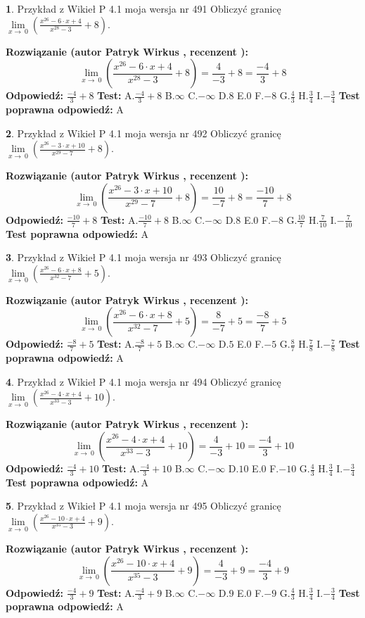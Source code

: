 \documentclass[12pt, a4paper]{article}
\theoremstyle{definition} %
\newtheorem{zad}{}
\newcommand{\zadStart}[1]{\begin{zad}#1\newline}
\newcommand{\zadStop}{\end{zad}}
\newcommand{\rozwStart}[2]{\noindent \textbf{Rozwiązanie (autor #1 , recenzent #2): }\newline}
\newcommand{\rozwStop}{\newline}
\newcommand{\odpStart}{\noindent \textbf{Odpowiedź:}\newline}
\newcommand{\odpStop}{\newline}
\newcommand{\testStart}{\noindent \textbf{Test:}\newline}
\newcommand{\testStop}{\newline}
\newcommand{\kluczStart}{\noindent \textbf{Test poprawna odpowiedź:}\newline}
\newcommand{\kluczStop}{\newline}
\begin{document}
\zadStart{Przykład z Wikieł P 4.1 moja wersja nr 491}
Obliczyć granicę $\lim\limits_{x\to\ 0}(\frac{x^{26}-6 \cdot x +4}{x^{28}-3}+8)$.
\zadStop
\rozwStart{Patryk Wirkus}{}
$$\lim\limits_{x\to\ 0}(\frac{x^{26}-6 \cdot x +4}{x^{28}-3}+8)=\frac{4}{-3}+8=\frac{-4}{3}+8$$
\rozwStop
\odpStart
$\frac{-4}{3}+8$
\odpStop
\testStart
A.$\frac{-4}{3}+8$
B.$\infty$
C.$-\infty$
D.$8$
E.$0$
F.$-8$
G.$\frac{4}{3}$
H.$\frac{3}{4}$
I.$-\frac{3}{4}$
\testStop
\kluczStart
A
\kluczStop



\zadStart{Przykład z Wikieł P 4.1 moja wersja nr 492}
Obliczyć granicę $\lim\limits_{x\to\ 0}(\frac{x^{26}-3 \cdot x +10}{x^{29}-7}+8)$.
\zadStop
\rozwStart{Patryk Wirkus}{}
$$\lim\limits_{x\to\ 0}(\frac{x^{26}-3 \cdot x +10}{x^{29}-7}+8)=\frac{10}{-7}+8=\frac{-10}{7}+8$$
\rozwStop
\odpStart
$\frac{-10}{7}+8$
\odpStop
\testStart
A.$\frac{-10}{7}+8$
B.$\infty$
C.$-\infty$
D.$8$
E.$0$
F.$-8$
G.$\frac{10}{7}$
H.$\frac{7}{10}$
I.$-\frac{7}{10}$
\testStop
\kluczStart
A
\kluczStop



\zadStart{Przykład z Wikieł P 4.1 moja wersja nr 493}
Obliczyć granicę $\lim\limits_{x\to\ 0}(\frac{x^{26}-6 \cdot x +8}{x^{32}-7}+5)$.
\zadStop
\rozwStart{Patryk Wirkus}{}
$$\lim\limits_{x\to\ 0}(\frac{x^{26}-6 \cdot x +8}{x^{32}-7}+5)=\frac{8}{-7}+5=\frac{-8}{7}+5$$
\rozwStop
\odpStart
$\frac{-8}{7}+5$
\odpStop
\testStart
A.$\frac{-8}{7}+5$
B.$\infty$
C.$-\infty$
D.$5$
E.$0$
F.$-5$
G.$\frac{8}{7}$
H.$\frac{7}{8}$
I.$-\frac{7}{8}$
\testStop
\kluczStart
A
\kluczStop



\zadStart{Przykład z Wikieł P 4.1 moja wersja nr 494}
Obliczyć granicę $\lim\limits_{x\to\ 0}(\frac{x^{26}-4 \cdot x +4}{x^{33}-3}+10)$.
\zadStop
\rozwStart{Patryk Wirkus}{}
$$\lim\limits_{x\to\ 0}(\frac{x^{26}-4 \cdot x +4}{x^{33}-3}+10)=\frac{4}{-3}+10=\frac{-4}{3}+10$$
\rozwStop
\odpStart
$\frac{-4}{3}+10$
\odpStop
\testStart
A.$\frac{-4}{3}+10$
B.$\infty$
C.$-\infty$
D.$10$
E.$0$
F.$-10$
G.$\frac{4}{3}$
H.$\frac{3}{4}$
I.$-\frac{3}{4}$
\testStop
\kluczStart
A
\kluczStop



\zadStart{Przykład z Wikieł P 4.1 moja wersja nr 495}
Obliczyć granicę $\lim\limits_{x\to\ 0}(\frac{x^{26}-10 \cdot x +4}{x^{35}-3}+9)$.
\zadStop
\rozwStart{Patryk Wirkus}{}
$$\lim\limits_{x\to\ 0}(\frac{x^{26}-10 \cdot x +4}{x^{35}-3}+9)=\frac{4}{-3}+9=\frac{-4}{3}+9$$
\rozwStop
\odpStart
$\frac{-4}{3}+9$
\odpStop
\testStart
A.$\frac{-4}{3}+9$
B.$\infty$
C.$-\infty$
D.$9$
E.$0$
F.$-9$
G.$\frac{4}{3}$
H.$\frac{3}{4}$
I.$-\frac{3}{4}$
\testStop
\kluczStart
A
\kluczStop
\end{document}
